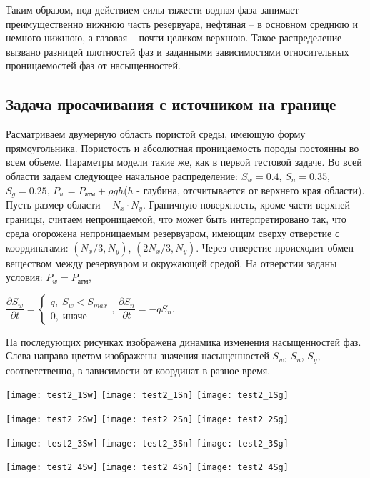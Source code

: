 Таким образом, под действием силы тяжести водная фаза занимает
преимущественно нижнюю часть резервуара, нефтяная -- в основном среднюю
и немного нижнюю, а газовая -- почти целиком верхнюю. Такое распределение
вызвано разницей плотностей фаз и заданными зависимостями относительных
проницаемостей фаз от насыщенностей.

\newpage
\subsection{Задача просачивания с источником на границе}
Расматриваем двумерную область пористой среды, имеющую форму
прямоугольника. Пористость и абсолютная проницаемость породы постоянны во всем
объеме. Параметры модели такие же, как
в первой тестовой задаче.
Во всей области задаем следующее 
начальное распределение: $S_w=0.4$,\; $S_n=0.35$,\; $S_g=0.25$, 
$P_w=P_\text{атм}+\rho g h$($h$ - глубина, отсчитывается от верхнего края области).
Пусть размер области -- $N_x\cdot N_y$.
Граничную поверхность, кроме части верхней границы, считаем непроницаемой, 
что может быть интерпретировано так,
что среда огорожена непроницаемым резервуаром, имеющим сверху отверстие с
координатами: $(N_x/3, N_y)$, $(2N_x/3, N_y)$. Через отверстие происходит обмен веществом между 
резервуаром и окружающей средой. На отверстии заданы условия: $P_w=P_\text{атм}$,

$ \dfrac{\partial S_w}{\partial t}= 
\begin{cases}
 q, \; S_w<S_{max}\\
 0, \; \text{иначе}
\end{cases}
$,
$ \dfrac{\partial S_n}{\partial t}=-q S_n$.

На последующих рисунках изображена динамика изменения насыщенностей 
фаз. Слева направо цветом изображены значения насыщенностей $S_w$, $S_n$, $S_g$, соответственно, 
в зависимости от координат в разное время.

\begin{center}
 \texttt{[image: test2\_1Sw]}
 \texttt{[image: test2\_1Sn]}
 \texttt{[image: test2\_1Sg]}
\end{center}
\begin{center}
 \texttt{[image: test2\_2Sw]}
 \texttt{[image: test2\_2Sn]}
 \texttt{[image: test2\_2Sg]}
\end{center}
\begin{center}
 \texttt{[image: test2\_3Sw]}
 \texttt{[image: test2\_3Sn]}
 \texttt{[image: test2\_3Sg]}
\end{center}
\begin{center}
 \texttt{[image: test2\_4Sw]}
 \texttt{[image: test2\_4Sn]}
 \texttt{[image: test2\_4Sg]}
\end{center}

